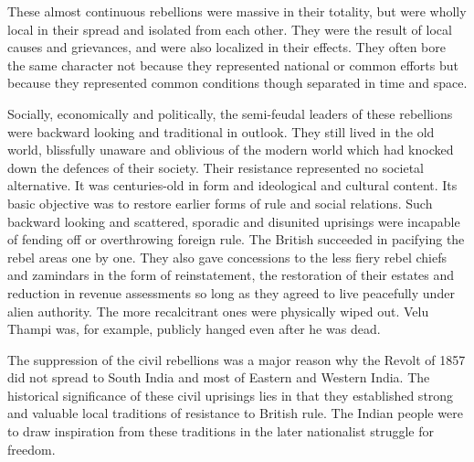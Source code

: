 \begin{multicols}{2}
These almost continuous rebellions were massive in their totality, but were wholly local in their spread and isolated from each other. They were the result of local causes and grievances, and were also localized in their effects. They often bore the same character not because they represented national or common efforts but because they represented common conditions though separated in time and space.

Socially, economically and politically, the semi-feudal leaders of these rebellions were backward looking and traditional in outlook. They still lived in the old world, blissfully unaware and oblivious of the modern world which had knocked down the defences of their society. Their resistance represented no societal alternative. It was centuries-old in form and ideological and cultural content. Its basic objective was to restore earlier forms of rule and social relations. Such backward looking and scattered, sporadic and disunited uprisings were incapable of fending off or overthrowing foreign rule. The British succeeded in pacifying the rebel areas one by one. They also gave concessions to the less fiery rebel chiefs and zamindars in the form of reinstatement, the restoration of their estates and reduction in revenue assessments so long as they agreed to live peacefully under alien authority. The more recalcitrant ones were physically wiped out. Velu Thampi was, for example, publicly hanged even after he was dead.

The suppression of the civil rebellions was a major reason why the Revolt of 1857 did not spread to South India and most of Eastern and Western India. The historical significance of these civil uprisings lies in that they established strong and valuable local traditions of resistance to British rule. The Indian people were to draw inspiration from these traditions in the later nationalist struggle for freedom.


\end{multicols}
